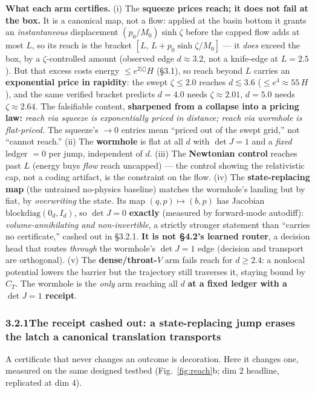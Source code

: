 \documentclass[11pt]{article}
\newcommand{\detJ}{\det J}
\begin{document}
\textbf{What each arm certifies.} (i) The \textbf{squeeze prices reach; it does not fail at the box.} It is a canonical map, not a flow: applied at the basin bottom it grants an \emph{instantaneous} displacement $(p_0/M_0)\sinh\zeta$ before the capped flow adds at most $L$, so its reach is the bracket $[L,\,L+p_0\sinh\zeta/M_0]$ --- it \emph{does} exceed the box, by a $\zeta$-controlled amount (observed edge $d\approx3.2$, not a knife-edge at $L=2.5$). But that excess costs energy $\le e^{2|\zeta|}H$ (\S3.1), so reach beyond $L$ carries an \textbf{exponential price in rapidity}: the swept $\zeta\le2.0$ reaches $d\lesssim3.6$ ($\le e^4\approx55\,H$), and the same verified bracket predicts $d=4.0$ needs $\zeta\approx2.01$, $d=5.0$ needs $\zeta\approx2.64$. The falsifiable content, \textbf{sharpened from a collapse into a pricing law:} \emph{reach via squeeze is exponentially priced in distance; reach via wormhole is flat-priced.} The squeeze's $\to0$ entries mean ``priced out of the swept grid,'' not ``cannot reach.'' (ii) The \textbf{wormhole} is flat at all $d$ with $\detJ=1$ and a \emph{fixed} ledger $=0$ per jump, independent of $d$. (iii) The \textbf{Newtonian control} reaches past $L$ (energy buys \emph{flow} reach uncapped) --- the control showing the relativistic cap, not a coding artifact, is the constraint on the flow. (iv) The \textbf{state-replacing map} (the untrained no-physics baseline) matches the wormhole's landing but by fiat, by \emph{overwriting} the state. Its map $(q,p)\mapsto(b,p)$ has Jacobian $\mathrm{blockdiag}(0_d,I_d)$, so $\detJ=0$ \textbf{exactly} (measured by forward-mode autodiff): \emph{volume-annihilating and non-invertible}, a strictly stronger statement than ``carries no certificate,'' cashed out in \S3.2.1. \textbf{It is not \S4.2's learned router}, a decision head that routes \emph{through} the wormhole's $\detJ=1$ edge (decision and transport are orthogonal). (v) The \textbf{dense/throat-$V$} arm fails reach for $d\ge2.4$: a nonlocal potential lowers the barrier but the trajectory still traverses it, staying bound by $C_T$. The wormhole is the \emph{only} arm reaching all $d$ \textbf{at a fixed ledger with a $\detJ=1$ receipt}.

\subsubsection*{3.2.1\quad The receipt cashed out: a state-replacing jump erases the latch a canonical translation transports}
A certificate that never changes an outcome is decoration. Here it changes one, measured on the same designed testbed (Fig.~\ref{fig:reach}b; dim $2$ headline, replicated at dim $4$).
\end{document}
